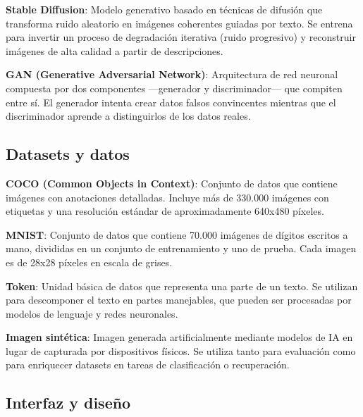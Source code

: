 \textbf{Stable Diffusion}: Modelo generativo basado en técnicas de difusión que transforma ruido aleatorio en imágenes coherentes guiadas por texto. Se entrena para invertir un proceso de degradación iterativa (ruido progresivo) y reconstruir imágenes de alta calidad a partir de descripciones.

\vspace{5mm}

\textbf{GAN (Generative Adversarial Network)}: Arquitectura de red neuronal compuesta por dos componentes —generador y discriminador— que compiten entre sí. El generador intenta crear datos falsos convincentes mientras que el discriminador aprende a distinguirlos de los datos reales.

\vspace{5mm}

\subsection{Datasets y datos}

\textbf{COCO (Common Objects in Context)}: Conjunto de datos que contiene imágenes con anotaciones detalladas. Incluye más de 330.000 imágenes con etiquetas y una resolución estándar de aproximadamente 640x480 píxeles.

\vspace{5mm}

\textbf{MNIST}: Conjunto de datos que contiene 70.000 imágenes de dígitos escritos a mano, divididas en un conjunto de entrenamiento y uno de prueba. Cada imagen es de 28x28 píxeles en escala de grises.

\vspace{5mm}

\textbf{Token}: Unidad básica de datos que representa una parte de un texto. Se utilizan para descomponer el texto en partes manejables, que pueden ser procesadas por modelos de lenguaje y redes neuronales.

\vspace{5mm}

\textbf{Imagen sintética}: Imagen generada artificialmente mediante modelos de IA en lugar de capturada por dispositivos físicos. Se utiliza tanto para evaluación como para enriquecer datasets en tareas de clasificación o recuperación.

\vspace{5mm}

\subsection{Interfaz y diseño}

